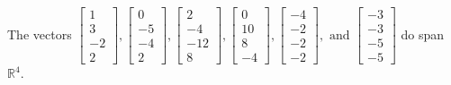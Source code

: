 \begin{exercise}
\begin{exerciseStatement}
  \end{exerciseStatement}
  \begin{exerciseAnswer}
   The vectors \(\left[\begin{array}{r}
1 \\
3 \\
-2 \\
2
\end{array}\right] , \left[\begin{array}{r}
0 \\
-5 \\
-4 \\
2
\end{array}\right] , \left[\begin{array}{r}
2 \\
-4 \\
-12 \\
8
\end{array}\right] , \left[\begin{array}{r}
0 \\
10 \\
8 \\
-4
\end{array}\right] , \left[\begin{array}{r}
-4 \\
-2 \\
-2 \\
-2
\end{array}\right] , \text{ and } \left[\begin{array}{r}
-3 \\
-3 \\
-5 \\
-5
\end{array}\right]\) 
  	 do  
	span \(\mathbb{R}^4\).
  


  \end{exerciseAnswer}
\end{exercise}